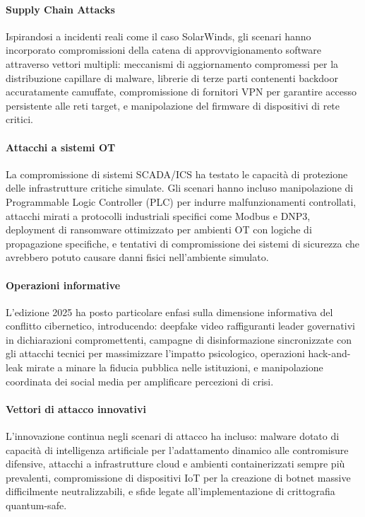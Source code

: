 \paragraph{Supply Chain Attacks}
Ispirandosi a incidenti reali come il caso SolarWinds, gli scenari hanno incorporato compromissioni della catena di approvvigionamento software attraverso vettori multipli: meccanismi di aggiornamento compromessi per la distribuzione capillare di malware, librerie di terze parti contenenti backdoor accuratamente camuffate, compromissione di fornitori VPN per garantire accesso persistente alle reti target, e manipolazione del firmware di dispositivi di rete critici.

\paragraph{Attacchi a sistemi OT}
La compromissione di sistemi SCADA/ICS ha testato le capacità di protezione delle infrastrutture critiche simulate. Gli scenari hanno incluso manipolazione di Programmable Logic Controller (PLC) per indurre malfunzionamenti controllati, attacchi mirati a protocolli industriali specifici come Modbus e DNP3, deployment di ransomware ottimizzato per ambienti OT con logiche di propagazione specifiche, e tentativi di compromissione dei sistemi di sicurezza che avrebbero potuto causare danni fisici nell'ambiente simulato.

\paragraph{Operazioni informative}
L'edizione 2025 ha posto particolare enfasi sulla dimensione informativa del conflitto cibernetico, introducendo: deepfake video raffiguranti leader governativi in dichiarazioni compromettenti, campagne di disinformazione sincronizzate con gli attacchi tecnici per massimizzare l'impatto psicologico, operazioni hack-and-leak mirate a minare la fiducia pubblica nelle istituzioni, e manipolazione coordinata dei social media per amplificare percezioni di crisi.

\paragraph{Vettori di attacco innovativi}
L'innovazione continua negli scenari di attacco ha incluso: malware dotato di capacità di intelligenza artificiale per l'adattamento dinamico alle contromisure difensive, attacchi a infrastrutture cloud e ambienti containerizzati sempre più prevalenti, compromissione di dispositivi IoT per la creazione di botnet massive difficilmente neutralizzabili, e sfide legate all'implementazione di crittografia quantum-safe.

